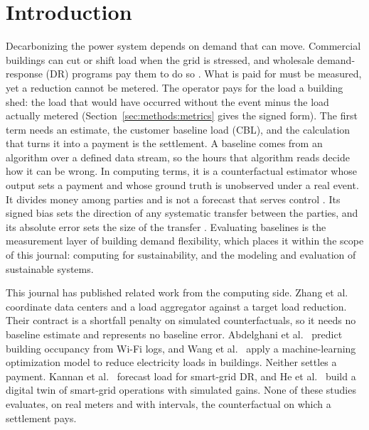 \section{Introduction}\label{sec:intro}

Decarbonizing the power system depends on demand that can move. Commercial buildings can cut or shift load when the grid is stressed, and wholesale demand-response (DR) programs pay them to do so \citep{siano2014,satchwell2021geb}. What is paid for must be measured, yet a reduction cannot be metered. The operator pays for the load a building shed: the load that would have occurred without the event minus the load actually metered (Section~\ref{sec:methods:metrics} gives the signed form). The first term needs an estimate, the customer baseline load (CBL), and the calculation that turns it into a payment is the settlement. A baseline comes from an algorithm over a defined data stream, so the hours that algorithm reads decide how it can be wrong. In computing terms, it is a counterfactual estimator whose output sets a payment and whose ground truth is unobserved under a real event. It divides money among parties and is not a forecast that serves control \citep{li2026review}. Its signed bias sets the direction of any systematic transfer between the parties, and its absolute error sets the size of the transfer \citep{wijaya2014}. Evaluating baselines is the measurement layer of building demand flexibility, which places it within the scope of this journal: computing for sustainability, and the modeling and evaluation of sustainable systems.

This journal has published related work from the computing side. Zhang et al.\ \citep{zhang2024suscom} coordinate data centers and a load aggregator against a target load reduction. Their contract is a shortfall penalty on simulated counterfactuals, so it needs no baseline estimate and represents no baseline error. Abdelghani et al.\ \citep{abdelghani2024suscom} predict building occupancy from Wi-Fi logs, and Wang et al.\ \citep{wang2023suscom} apply a machine-learning optimization model to reduce electricity loads in buildings. Neither settles a payment. Kannan et al.\ \citep{kannan2025suscom} forecast load for smart-grid DR, and He et al.\ \citep{he2025suscom} build a digital twin of smart-grid operations with simulated gains. None of these studies evaluates, on real meters and with intervals, the counterfactual on which a settlement pays.


